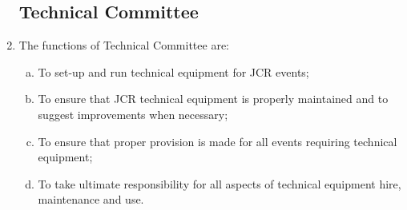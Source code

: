 \documentclass[12pt]{article}  %
\begin{document}
\begin{enumerate}
	\subsection{Technical Committee}
	\item The functions of Technical Committee are:
	\begin{enumerate}[(a)]
		\item To set-up and run technical equipment for JCR events;
		\item To ensure that JCR technical equipment is properly maintained and to suggest improvements when necessary;
		\item To ensure that proper provision is made for all events requiring technical equipment;
		\item To take ultimate responsibility for all aspects of technical equipment hire, maintenance and use.
	\end{enumerate}

\end{enumerate}
\end{document}
